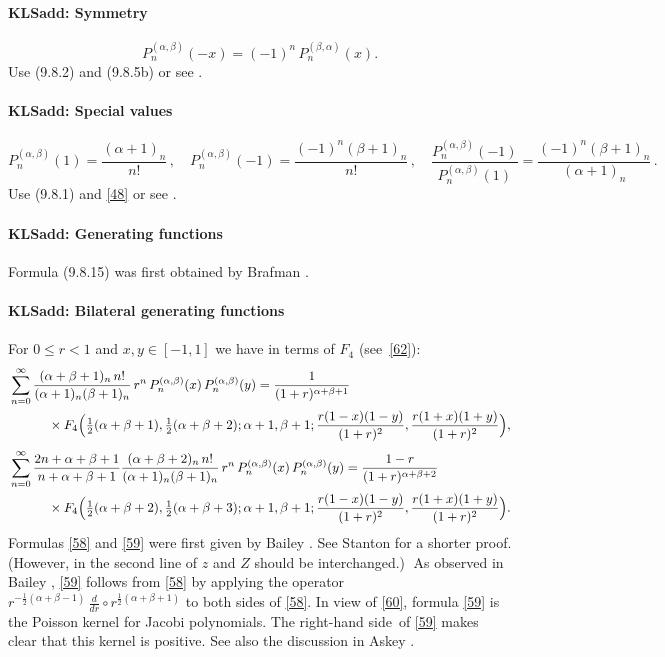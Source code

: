 \documentclass[envcountchap,graybox]{svmono}
\newcounter{rom}
\newcommand\sa{\smallskipamount}
\newcommand\sLP{\\[\sa]}
\newcommand\al\alpha
\newcommand\be\beta
\newcommand\half{\frac12}
\newcommand\thalf{\tfrac12}
\newcommand\iy\infty
\newcommand\RHS{right-hand side}
\begin{document}
%
\paragraph{\large\bf KLSadd: Symmetry}\begin{equation}
P_n^{(\al,\be)}(-x)=(-1)^n\,P_n^{(\be,\al)}(x).
\label{48}
\end{equation}
Use (9.8.2) and (9.8.5b) or see .
%
\paragraph{\large\bf KLSadd: Special values}\begin{equation}
P_n^{(\al,\be)}(1)=\frac{(\al+1)_n}{n!}\,,\quad
P_n^{(\al,\be)}(-1)=\frac{(-1)^n(\be+1)_n}{n!}\,,\quad
\frac{P_n^{(\al,\be)}(-1)}{P_n^{(\al,\be)}(1)}=\frac{(-1)^n(\be+1)_n}{(\al+1)_n}\,.
\label{50}
\end{equation}
Use (9.8.1) and \eqref{48} or see .
%
\paragraph{\large\bf KLSadd: Generating functions}Formula (9.8.15) was first obtained by Brafman .
%
\paragraph{\large\bf KLSadd: Bilateral generating functions}For $0\le r<1$ and $x,y\in[-1,1]$ we have in terms of $F_4$ (see~\eqref{62}):
\begin{align}
&\sum_{n=0}^\iy\frac{(\al+\be+1)_n\,n!}{(\al+1)_n(\be+1)_n}\,r^n\,
P_n^{(\al,\be)}(x)\,P_n^{(\al,\be)}(y)
=\frac1{(1+r)^{\al+\be+1}}
\nonumber\\
&\qquad\quad\times F_4\Big(\thalf(\al+\be+1),\thalf(\al+\be+2);\al+1,\be+1;
\frac{r(1-x)(1-y)}{(1+r)^2},\frac{r(1+x)(1+y)}{(1+r)^2}\Big),
\label{58}\sLP
&\sum_{n=0}^\iy\frac{2n+\al+\be+1}{n+\al+\be+1}
\frac{(\al+\be+2)_n\,n!}{(\al+1)_n(\be+1)_n}\,r^n\,
P_n^{(\al,\be)}(x)\,P_n^{(\al,\be)}(y)
=\frac{1-r}{(1+r)^{\al+\be+2}}\nonumber\\
&\qquad\quad\times F_4\Big(\thalf(\al+\be+2),\thalf(\al+\be+3);\al+1,\be+1;
\frac{r(1-x)(1-y)}{(1+r)^2},\frac{r(1+x)(1+y)}{(1+r)^2}\Big).
\label{59}
\end{align}
Formulas \eqref{58} and \eqref{59} were first
given by Bailey .
See Stanton  for a shorter proof.
(However, in the second line of
 $z$ and $Z$ should be interchanged.)$\;$
As observed in Bailey , \eqref{59} follows
from \eqref{58}
by applying the operator $r^{-\half(\al+\be-1)}\,\frac d{dr}\circ r^{\half(\al+\be+1)}$
to both sides of \eqref{58}.
In view of \eqref{60}, formula \eqref{59} is the Poisson kernel for Jacobi
polynomials. The \RHS\ of \eqref{59} makes clear that this kernel is positive.
See also the discussion in Askey .
%
\end{document}
